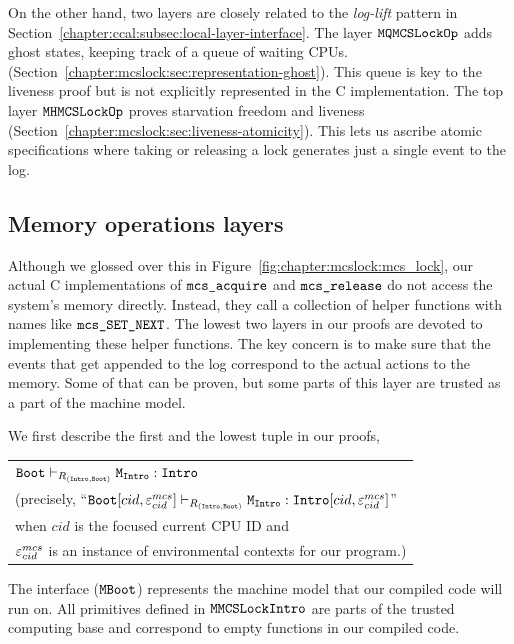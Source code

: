 On the other hand, two layers are closely related to the  \textit{log-lift} pattern in Section~\ref{chapter:ccal:subsec:local-layer-interface}.
The layer ${\mathrm{\texttt{MQMCSLockOp}}}$ adds ghost states, keeping track of a
queue of waiting CPUs.
(Section~\ref{chapter:mcslock:sec:representation-ghost}). This queue is key to the liveness proof but is not explicitly represented in the C implementation.
The top layer ${\mathrm{\texttt{MHMCSLockOp}}}$ proves starvation freedom and liveness
(Section~\ref{chapter:mcslock:sec:liveness-atomicity}). This lets us ascribe atomic
specifications where taking or releasing a lock generates just a
single event to the log.

\subsection{Memory operations layers}
\label{chapter:mcslock:subsec:lowestmachinemodel}


Although we glossed over this in Figure~\ref{fig:chapter:mcslock:mcs_lock}, our
actual C implementations of ${\mathrm{\texttt{mcs\_acquire}}}$ and
${\mathrm{\texttt{mcs\_release}}}$ do not access the system's memory directly.  Instead, they call
a collection of helper functions with names like
${\mathrm{\texttt{mcs\_SET\_NEXT}}}$. The lowest two layers in our proofs
are devoted to implementing these helper functions.
The key concern is to make sure that the events that get appended to the log correspond to the actual actions to the memory. Some of that can be proven, 
but some parts of this layer are trusted as a part of the machine model.

We first describe the first and the lowest tuple in our proofs,

\begin{center}
\begin{tabular}{P{0.95\textwidth}}
${\mathrm{\texttt{Boot}}} \vdash_{R_{({\mathrm{\texttt{Intro}}}, {\mathrm{\texttt{Boot}}})}} {\mathrm{\texttt{M}}}_{{\mathrm{\texttt{Intro}}}} : {\mathrm{\texttt{Intro}}}$\\
(precisely, ``${\mathrm{\texttt{Boot}}}[cid, {\varepsilon}^{mcs}_{cid}] \vdash_{R_{({\mathrm{\texttt{Intro}}}, {\mathrm{\texttt{Boot}}})}} {\mathrm{\texttt{M}}}_{{\mathrm{\texttt{Intro}}}} : {\mathrm{\texttt{Intro}}}[cid, {\varepsilon}^{mcs}_{cid}]$'' \\
when $cid$ is the focused current CPU ID and\\
 ${\varepsilon}^{mcs}_{cid}$ is an instance of environmental contexts for our program.)\\
\end{tabular}
\end{center}

The interface (${\mathrm{\texttt{MBoot}}}$) represents the machine model that our compiled code will run on.
All primitives defined in ${\mathrm{\texttt{MMCSLockIntro}}}$ are parts of the trusted computing base and correspond to empty functions in our compiled code.

